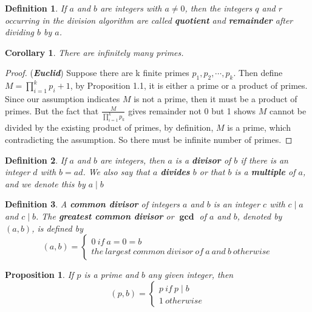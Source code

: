 \documentclass{article}
\newtheorem*{definition}{Definition}
\newtheorem{proposition}[theorem]{Proposition}
\newtheorem{corollary}[theorem]{Corollary}
\begin{document}
    \begin{definition}
        If \(a\) and \(b\) are integers with \(a \neq 0\), then the integers \(q\) and 
        \(r\) occurring in the division algorithm are called \textbf{quotient} and 
        \textbf{remainder} after dividing \(b\) by \(a\).
    \end{definition}
    \begin{corollary}
        There are infinitely many primes.
    \end{corollary}
    \begin{proof}
        (\textbf{\textit{Euclid}})  Suppose there are k finite primes \(p_1, p_2, \cdots, p_k\).
        Then define \(M=\prod_{i=1}^k p_i + 1\), by Proposition 1.1, it is either a 
        prime or a product of primes. Since our assumption indicates \(M\) is not a 
        prime, then it must be a product of primes. But the fact that \(\frac{M}{\prod_{i=1}^k p_k}\) 
        gives remainder not 0 but 1 shows \(M\) cannot be divided by the existing 
        product of primes, by definition, \(M\) is a prime, which contradicting the 
        assumption. So there must be infinite number of primes.
    \end{proof}
    \begin{definition}
        If \(a\) and \(b\) are integers, then \(a\) is a \textbf{divisor} of \(b\) if 
        there is an integer \(d\) with \(b=ad\). We also say that \(a\) \textbf{divides} 
        \(b\) or that \(b\) is a \textbf{multiple} of \(a\), and we denote this by \(a \mid b\)
    \end{definition}
    \begin{definition}
        A \textbf{common divisor} of integers \(a\) and \(b\) is an integer \(c\) with 
        \(c \mid a\) and \(c \mid b\). The \textbf{greatest common divisor} or \(\bm{\gcd}\) 
        of \(a\) and \(b\), denoted by \((a, b)\), is defined by 
        \begin{equation*}
            (a, b) = \begin{cases}
                0 \ if \  a=0=b\\
                the\ largest\ common\ divisor\ of\ a\ and\ b\ otherwise
            \end{cases}
        \end{equation*}
    \end{definition}
    \begin{proposition}
        If \(p\) is a prime and \(b\) any given integer, then 
        \[
            (p, b)=\begin{cases}
                p\ if\ p \mid b\\
                1\ otherwise
            \end{cases}  
        \]
    \end{proposition}
\end{document}
